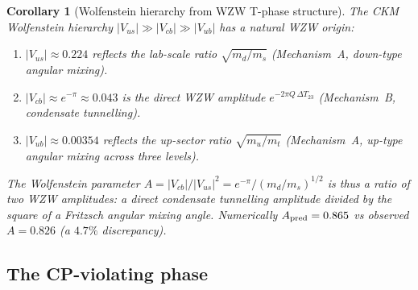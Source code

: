 \documentclass[11pt,a4paper]{article}
\newtheorem{corollary}[theorem]{Corollary}
\theoremstyle{definition}
\theoremstyle{remark}
\begin{document}
\begin{corollary}[Wolfenstein hierarchy from WZW T-phase structure]
\label{P5:cor:ckm_wolfenstein}
The CKM Wolfenstein hierarchy $|V_{us}| \gg |V_{cb}| \gg |V_{ub}|$
has a natural WZW origin:
\begin{enumerate}[noitemsep,label=(\roman*)]
\item $|V_{us}| \approx 0.224$ reflects the lab-scale ratio $\sqrt{m_d/m_s}$
  (Mechanism~A, down-type angular mixing).
\item $|V_{cb}| \approx e^{-\pi} \approx 0.043$ is the direct WZW amplitude
  $e^{-2\pi Q\,\Delta T_{23}}$ (Mechanism~B, condensate tunnelling).
\item $|V_{ub}| \approx 0.00354$ reflects the up-sector ratio $\sqrt{m_u/m_t}$
  (Mechanism~A, up-type angular mixing across three levels).
\end{enumerate}
The Wolfenstein parameter $A = |V_{cb}|/|V_{us}|^2 = e^{-\pi}/(m_d/m_s)^{1/2}$
is thus a ratio of two WZW amplitudes: a direct condensate tunnelling
amplitude divided by the square of a Fritzsch angular mixing angle.
Numerically $A_{\rm pred} = 0.865$ vs observed $A = 0.826$ (a $4.7\%$ discrepancy).
\end{corollary}

\subsection{The CP-violating phase}
\label{P5:subsec:cp_phase_remark}
\end{document}
